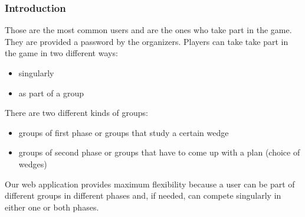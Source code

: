 \subsubsection{Introduction}
Those are the most common users and are the ones who take part in the game. They are provided a password by the organizers.		
Players can take take part in the game in two different ways:
\begin{itemize}
	\item singularly
	\item as part of a group
\end{itemize}
There are two different kinds of groups:
\begin{itemize}
	\item groups of first phase or groups that study a certain wedge
	\item groups of second phase or groups that have to come up with a plan (choice of wedges)
\end{itemize}
Our web application provides maximum flexibility because a user can be part of different groups in different phases and, if needed, can compete singularly in either one or both phases.

